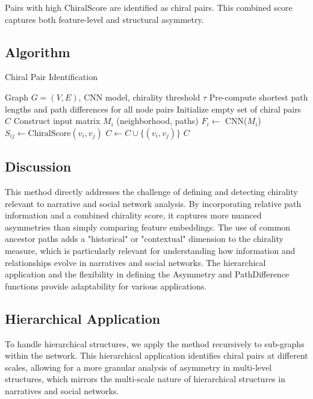 \documentclass[12pt, a4paper]{article}
\begin{document}
Pairs with high $\text{ChiralScore}$ are identified as chiral pairs. This combined score captures both feature-level and structural asymmetry.

\subsection{Algorithm}

\begin{algorithm}[H]
\caption{Chiral Pair Identification}
\begin{algorithmic}[1]
\Require Graph $G=(V,E)$, CNN model, chirality threshold $\tau$
\State Pre-compute shortest path lengths and path differences for all node pairs
\State Initialize empty set of chiral pairs $C$
    \State Construct input matrix $M_i$ (neighborhood, paths)
    \State $F_i \gets$ CNN($M_i$)
\EndFor
{}
    \State $S_{ij} \gets \text{ChiralScore}(v_i, v_j)$
        \State $C \gets C \cup \{(v_i, v_j)\}$
    \EndIf
\EndFor
\Return $C$
\end{algorithmic}
\end{algorithm}

\subsection{Discussion}

This method directly addresses the challenge of defining and detecting chirality relevant to narrative and social network analysis. By incorporating relative path information and a combined chirality score, it captures more nuanced asymmetries than simply comparing feature embeddings. The use of common ancestor paths adds a "historical" or "contextual" dimension to the chirality measure, which is particularly relevant for understanding how information and relationships evolve in narratives and social networks. The hierarchical application and the flexibility in defining the Asymmetry and PathDifference functions provide adaptability for various applications.

\subsection{Hierarchical Application}

To handle hierarchical structures, we apply the method recursively to sub-graphs within the network. This hierarchical application identifies chiral pairs at different scales, allowing for a more granular analysis of asymmetry in multi-level structures, which mirrors the multi-scale nature of hierarchical structures in narratives and social networks.
\end{document}

